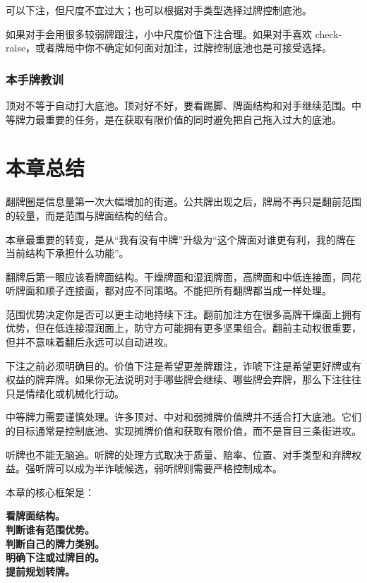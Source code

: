 可以下注，但尺度不宜过大；也可以根据对手类型选择过牌控制底池。

如果对手会用很多较弱牌跟注，小中尺度价值下注合理。如果对手喜欢 check-raise，或者牌局中你不确定如何面对加注，过牌控制底池也是可接受选择。

\subsubsection*{本手牌教训}

顶对不等于自动打大底池。顶对好不好，要看踢脚、牌面结构和对手继续范围。中等牌力最重要的任务，是在获取有限价值的同时避免把自己拖入过大的底池。

\section{本章总结}

翻牌圈是信息量第一次大幅增加的街道。公共牌出现之后，牌局不再只是翻前范围的较量，而是范围与牌面结构的结合。

本章最重要的转变，是从“我有没有中牌”升级为“这个牌面对谁更有利，我的牌在当前结构下承担什么功能”。

翻牌后第一眼应该看牌面结构。干燥牌面和湿润牌面，高牌面和中低连接面，同花听牌面和顺子连接面，都对应不同策略。不能把所有翻牌都当成一样处理。

范围优势决定你是否可以更主动地持续下注。翻前加注方在很多高牌干燥面上拥有优势，但在低连接湿润面上，防守方可能拥有更多坚果组合。翻前主动权很重要，但并不意味着翻后永远可以自动进攻。

下注之前必须明确目的。价值下注是希望更差牌跟注，诈唬下注是希望更好牌或有权益的牌弃牌。如果你无法说明对手哪些牌会继续、哪些牌会弃牌，那么下注往往只是情绪化或机械化行动。

中等牌力需要谨慎处理。许多顶对、中对和弱摊牌价值牌并不适合打大底池。它们的目标通常是控制底池、实现摊牌价值和获取有限价值，而不是盲目三条街进攻。

听牌也不能无脑追。听牌的处理方式取决于质量、赔率、位置、对手类型和弃牌权益。强听牌可以成为半诈唬候选，弱听牌则需要严格控制成本。

本章的核心框架是：

\begin{center}
\textbf{看牌面结构。\\
判断谁有范围优势。\\
判断自己的牌力类别。\\
明确下注或过牌目的。\\
提前规划转牌。}
\end{center}

